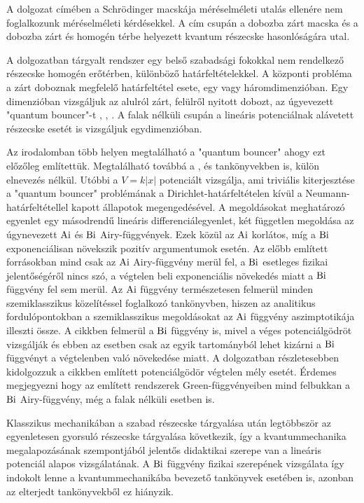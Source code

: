 A dolgozat címében a Schrödinger macskája méréselméleti utalás ellenére nem foglalkozunk méréselméleti kérdésekkel. A cím csupán a dobozba zárt macska és a dobozba zárt és homogén térbe helyezett kvantum részecske hasonlóságára utal.

A dolgozatban tárgyalt rendszer egy belső szabadsági fokokkal nem rendelkező részecske homogén erőtérben, különböző határfeltételekkel. A központi probléma a zárt doboznak megfelelő határfeltétel esete, egy vagy háromdimenzióban. Egy dimenzióban vizsgáljuk az alulról zárt, felülről nyitott dobozt, az úgyevezett "quantum bouncer"-t \cite{vankov2009quantum}, \cite{doi:10.1119/1.10024}, \cite{doi:10.1119/1.16673}. A falak nélküli csupán a lineáris potenciálnak alávetett részecske esetét \cite[137-138.o.]{Vallee:2010:AFA} is vizsgáljuk egydimenzióban.

Az irodalomban több helyen megtalálható a "quantum bouncer" ahogy ezt előzőleg említettük. Megtalálható továbbá a \cite{Landau1981Quantum}, \cite{Griffiths2004Introduction} és \cite{Sakurai:1167961} tankönyvekben is, külön elnevezés nélkül. Utóbbi a $V=k\lvert x \rvert$ potenciált vizsgálja, ami triviális kiterjesztése a "quantum bouncer" problémának a Dirichlet-határfeltételen kívül a Neumann-határfeltétellel kapott állapotok megengedésével. A megoldásokat meghatározó egyenlet egy másodrendű lineáris differenciálegyenlet, két független megoldása az úgynevezett $\mathrm{Ai}$ és $\mathrm{Bi}$ Airy-függvények. Ezek közül az $\mathrm{Ai}$ korlátos, míg a $\mathrm{Bi}$ exponenciálisan növekszik pozitív argumentumok esetén. Az előbb említett forrásokban mind csak az $\mathrm{Ai}$ Airy-függvény merül fel, a $\mathrm{Bi}$ esetleges fizikai jelentőségéről nincs szó, a végtelen beli exponenciális növekedés miatt a $\mathrm{Bi}$ függvény fel sem merül. Az $\mathrm{Ai}$ függvény természetesen felmerül minden szemiklasszikus közelítéssel foglalkozó tankönyvben, hiszen az analitikus fordulópontokban a szemiklasszikus megoldásokat az $\mathrm{Ai}$ függvény aszimptotikája illeszti össze. A \cite{doi:10.1007/s12043-001-0081-1} cikkben felmerül a $\mathrm{Bi}$ függvény is, mivel a véges potenciálgödröt vizsgálják és ebben az esetben csak az egyik tartományból lehet kizárni a $\mathrm{Bi}$ függvényt a végtelenben való növekedése miatt. A dolgozatban részletesebben kidolgozzuk a cikkben említett potenciálgödör végtelen mély esetét. Érdemes megjegyezni hogy az említett rendszerek Green-függvényeiben mind felbukkan a $\mathrm{Bi}$ Airy-függvény, még a falak nélküli esetben is.

Klasszikus mechanikában a szabad részecske tárgyalása után legtöbbször az egyenletesen gyorsuló részecske tárgyalása következik, így a kvantummechanika megalapozásának szempontjából jelentős didaktikai szerepe van a lineáris potenciál alapos vizsgálatának. A $\mathrm{Bi}$ függvény fizikai szerepének vizsgálata így indokolt lenne a kvantummechanikába bevezető tankönyvek esetében is, azonban az elterjedt tankönyvekből ez hiányzik.

